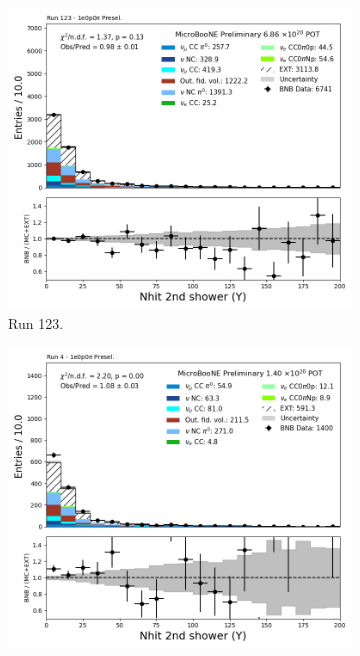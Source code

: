 \begin{figure}[H]
    \centering
    \begin{subfigure}[t]{0.32\linewidth}
        \includegraphics[width=\linewidth]{technote/Appendix_Preselection/Figures/1e0p0pi/Run123/secondshower_Y_nhit_Run123_1e0p0pi_Presel.png}
        \caption{Run 123.}
    \end{subfigure}%
    \hspace{0.2cm}%
    \begin{subfigure}[t]{0.32\linewidth}
        \includegraphics[width=\linewidth]{technote/Appendix_Preselection/Figures/1e0p0pi/Run4b/secondshower_Y_nhit_Run4b_1e0p0pi_Presel.png}

\end{subfigure}
\end{figure}

